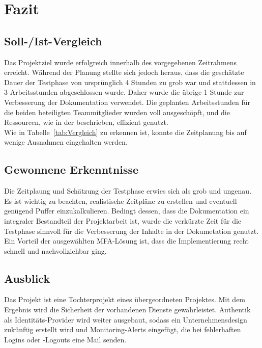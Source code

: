 \section{Fazit} 
\label{sec:Fazit}

\subsection{Soll-/Ist-Vergleich}
\label{sec:SollIstVergleich}
Das Projektziel wurde erfolgreich innerhalb des vorgegebenen Zeitrahmens erreicht. Während der Planung stellte sich jedoch heraus, dass die 
geschätzte Dauer der Testphase von ursprünglich 4 Stunden zu grob war und stattdessen in 3 Arbeitsstunden abgeschlossen wurde. Daher wurde die 
übrige 1 Stunde zur Verbesserung der Dokumentation verwendet. Die geplanten Arbeitsstunden für die beiden beteiligten Teammitglieder 
wurden voll ausgeschöpft, und die Ressourcen, wie in der  beschrieben, effizient genutzt.
\\Wie in Tabelle~\ref{tab:Vergleich}  zu erkennen ist, konnte die Zeitplanung bis auf wenige Ausnahmen eingehalten werden.

\subsection{Gewonnene Erkenntnisse}
\label{sec:Gewonnene Erkenntnisse}
Die Zeitplaung und Schätzung der Testphase erwies sich als grob und ungenau. Es ist wichtig zu beachten, realistische Zeitpläne zu erstellen 
und eventuell genügend Puffer einzukalkulieren. Bedingt dessen, dass die Dokumentation ein integraler Bestandteil der Projektarbeit ist, 
wurde die verkürzte Zeit für die Testphase sinnvoll für die Verbesserung der Inhalte in der Dokumetation genutzt. Ein Vorteil der 
ausgewählten \acs{MFA}-Lösung ist, dass die Implementierung recht schnell und nachvollziehbar ging.

\subsection{Ausblick}
\label{sec:Ausblick}
Das Projekt ist eine Tochterprojekt eines übergeordneten Projektes. Mit dem Ergebnis wird die Sicherheit der vorhandenen Dienste gewährleistet. 
Authentik als Identitäts-Provider wird weiter ausgebaut, sodass ein Unternehmensdesign zukünftig erstellt wird und Monitoring-Alerts eingefügt, 
die bei fehlerhaften Logins oder -Logouts eine Mail senden.
